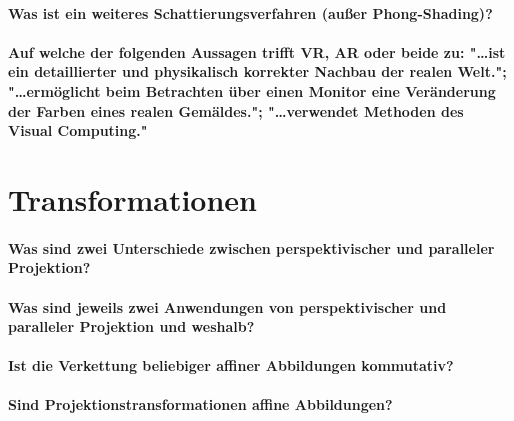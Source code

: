 \paragraph{Was ist ein weiteres Schattierungsverfahren (außer Phong-Shading)?}

\paragraph{Auf welche der folgenden Aussagen trifft VR, AR oder beide zu: "\dots ist ein detaillierter und physikalisch korrekter Nachbau der realen Welt."; "\dots ermöglicht beim Betrachten über einen Monitor eine Veränderung der Farben eines realen Gemäldes."; "\dots verwendet Methoden des Visual Computing."}

\section{Transformationen}
\paragraph{Was sind zwei Unterschiede zwischen perspektivischer und paralleler Projektion?}

\paragraph{Was sind jeweils zwei Anwendungen von perspektivischer und paralleler Projektion und weshalb?}

\paragraph{Ist die Verkettung beliebiger affiner Abbildungen kommutativ?}

\paragraph{Sind Projektionstransformationen affine Abbildungen?}

